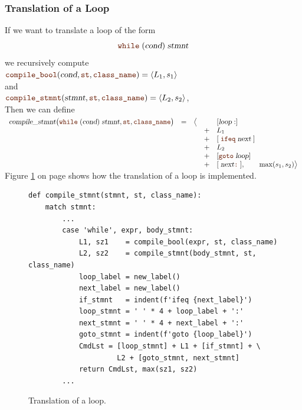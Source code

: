\subsubsection{Translation of a Loop}
If we want to translate a  loop of the form 
\[ \mytt{while}\;(\textsl{cond})\;\textsl{stmnt} \]
we recursively compute
\\[0.2cm]
\hspace*{1.3cm}
$\mytt{compile\_bool}(\textsl{cond}, \mytt{st}, \mytt{class\_name}) = \pair(L_1, s_1)$
\\[0.2cm]
and
\\[0.2cm]
\hspace*{1.3cm}
$\mytt{compile\_stmnt}(\textsl{stmnt}, \mytt{st}, \mytt{class\_name}) = \pair(L_2, s_2)$,
\\[0.2cm]
Then we can define
\\[0.2cm]
\hspace*{0.3cm}
$
   \begin{array}[t]{lcccl}
     \textsl{compile\_stmnt}\bigl(\mytt{while}\; (\textsl{cond})\;\textsl{stmnt}, \mytt{st}, \mytt{class\_name}\bigr)
     & = & \bigl\langle & & [ \textsl{loop}:]  \\
   &&& + & L_1 \\
   &&& + & [\;\mytt{ifeq}\;\textsl{next}\;] \\
   &&& + & L_2 \\
   &&& + & [\mytt{goto}\;\textsl{loop}] \\
   &&& + & [\;\textsl{next}\mytt{:}\;], \qquad \max(s_1, s_2) \bigr\rangle        
\end{array}
$
\\[0.2cm]
Figure \ref{fig:Compiler.ipynb:compile:while} on page \pageref{fig:Compiler.ipynb:compile:while} shows how the
translation of a loop is implemented.

\begin{figure}[!ht]
\centering
\begin{verbatim}
def compile_stmnt(stmnt, st, class_name):
    match stmnt:
        ...
        case 'while', expr, body_stmnt:
            L1, sz1    = compile_bool(expr, st, class_name)
            L2, sz2    = compile_stmnt(body_stmnt, st, class_name)
            loop_label = new_label()
            next_label = new_label()
            if_stmnt   = indent(f'ifeq {next_label}')
            loop_stmnt = ' ' * 4 + loop_label + ':'
            next_stmnt = ' ' * 4 + next_label + ':'
            goto_stmnt = indent(f'goto {loop_label}')
            CmdLst = [loop_stmnt] + L1 + [if_stmnt] + \
                     L2 + [goto_stmnt, next_stmnt]
            return CmdLst, max(sz1, sz2)
        ...
\end{verbatim}
\vspace*{-0.3cm}
\caption{Translation of a loop.}
\label{fig:Compiler.ipynb:compile:while}
\end{figure}

